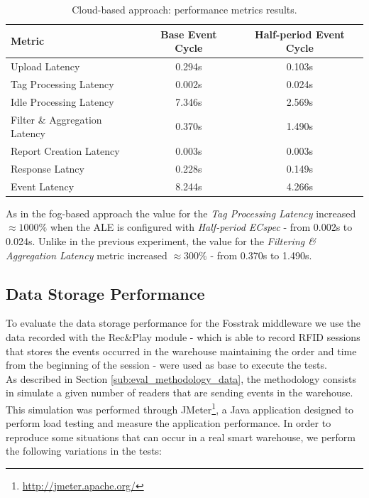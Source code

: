 \begin{table}[ht!]
  \centering
    \begin{tabular}{|l|c|c|}
    \hline
    Metric                        & Base Event Cycle & Half-period Event Cycle \\ \hline
    Upload Latency                & 0.294s           & 0.103s                  \\ \hline
    Tag Processing Latency        & 0.002s           & 0.024s                  \\ \hline
    Idle Processing Latency       & 7.346s           & 2.569s                  \\ \hline
    Filter \& Aggregation Latency & 0.370s           & 1.490s                  \\ \hline
    Report Creation Latency       & 0.003s           & 0.003s                  \\ \hline
    Response Latncy               & 0.228s           & 0.149s                  \\ \hline
    Event Latency                 & 8.244s           & 4.266s                  \\ \hline
    \end{tabular}
  \caption[Cloud-based approach: performance results.]{Cloud-based approach: performance metrics results.}
  \label{table:cloud_metrics}
\end{table}

As in the fog-based approach the value for the \textit{Tag Processing Latency} increased $\approx1000\%$ when
the \gls{ALE} is configured with \textit{Half-period ECspec} - from 0.002s to 0.024s. Unlike in the
previous experiment, the value for the \textit{Filtering \& Aggregation Latency} metric increased $\approx300\%$
- from 0.370s to 1.490s.

\subsection{Data Storage Performance}
\label{sub:eval_exp_data}
To evaluate the data storage performance for the Fosstrak middleware we use the data recorded with the Rec\&Play
module - which is able to record \gls{RFID} sessions that stores the events occurred in the warehouse
maintaining the order and time from the beginning of the session - were used as base to execute
the tests.\\

As described in Section \ref{sub:eval_methodology_data}, the methodology consists in simulate a given
number of readers that are sending events in the warehouse. This simulation was performed through JMeter\footnote{\url{http://jmeter.apache.org/}},
a Java application designed to perform load testing and measure the application performance.
In order to reproduce some situations that can occur in a real smart warehouse, we perform the following
variations in the tests:

